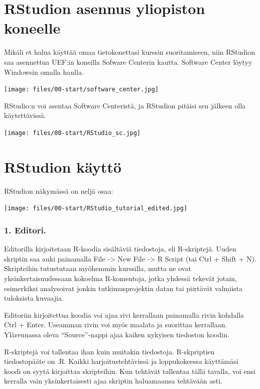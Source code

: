 \documentclass[
]{book}
\begin{document}
\hypertarget{rstudion-asennus-yliopiston-koneelle}{%
\section*{RStudion asennus yliopiston koneelle}\label{rstudion-asennus-yliopiston-koneelle}}

Mikäli et halua käyttää omaa tietokonettasi kurssin suoritamiseen, niin RStudion saa asennettua UEF:in koneilla Sofware Centerin kautta. Software Center löytyy Windowsin omalla haulla.

\texttt{[image: files/00-start/software\_center.jpg]}

RStudio:n voi asentaa Software Centeristä, ja RStudion pitäisi sen jälkeen olla käytettävissä.

\texttt{[image: files/00-start/RStudio\_sc.jpg]}

\hypertarget{rstudion-kuxe4yttuxf6}{%
\section*{RStudion käyttö}\label{rstudion-kuxe4yttuxf6}}

RStudion näkymässä on neljä osaa:

\texttt{[image: files/00-start/RStudio\_tutorial\_edited.jpg]}

\hypertarget{editori.}{%
\subsubsection*{1. Editori.}\label{editori.}}

Editorilla kirjoitetaan R-koodia sisältäviä tiedostoja, eli R-skriptejä. Uuden skriptin saa auki painamalla File -\textgreater{} New File -\textgreater{} R Script (tai Ctrl + Shift + N). Skripteihin tutustutaan myöhemmin kurssilla, mutta ne ovat yksinkertaisuudessaan kokoelma R-komentoja, jotka yhdessä tekevät jotain, esimerkiksi analysoivat jonkin tutkimusprojektin datan tai piirtävät valmiista tuloksista kuvaajia.

Editoriin kirjoitettua koodia voi ajaa rivi kerrallaan painamalla rivin kohdalla Ctrl + Enter. Useamman rivin voi myös maalata ja suorittaa kerrallaan. Yläreunassa oleva ``Source''-nappi ajaa kaiken nykyisen tiedoston koodin.

R-skriptejä voi tallentaa ihan kuin muitakin tiedostoja. R-skpriptien tiedostopääte on .R. Kaikki harjoitustehtävissä ja loppukokeessa käyttämäsi koodi on syytä kirjoittaa skripteihin. Kun tehtävät tallentaa tällä tavalla, voi ensi kerralla vain yksinkertaisesti ajaa skriptin haluamaansa tehtävään asti.
\end{document}
